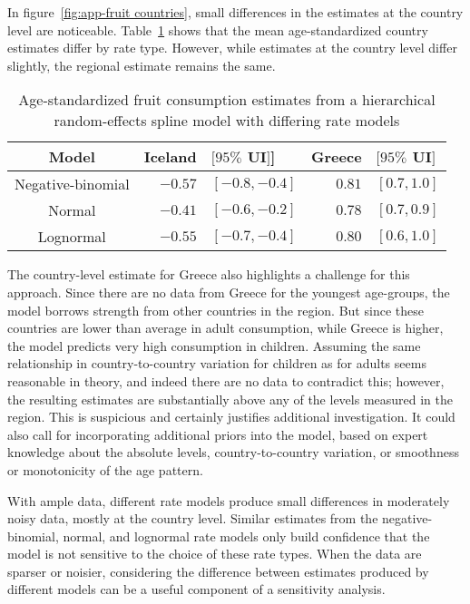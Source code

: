 In figure~\ref{fig:app-fruit countries},
small differences in the estimates at the country level are noticeable.
Table~\ref{tab:app-fruit rfx} shows that the mean age-standardized
country estimates differ by rate type.  However, while estimates at
the country level differ slightly, the regional estimate remains the same.

    \begin{table}[h]
        \begin{center}
        \begin{tabular}{|c|rl|rl|}
            \hline
                Model & Iceland&$[95\%$ UI$]$] & Greece&$[95\%$ UI$]$ \\
            \hline
                Negative-binomial & $-0.57$&$ [-0.8, -0.4]$ & $0.81$&$ [0.7, 1.0]$ \\
                Normal & $-0.41$&$ [-0.6, -0.2]$ & $0.78$&$ [0.7, 0.9]$ \\
                Lognormal & $-0.55$& $[-0.7, -0.4]$ & $0.80$&$ [0.6, 1.0]$ \\
            \hline
        \end{tabular}
        \end{center}
        \caption{ Age-standardized fruit consumption estimates
          from a hierarchical random-effects spline model with differing
          rate models}
        \label{tab:app-fruit rfx}
    \end{table}

The country-level estimate for Greece also highlights a challenge for
this approach.  Since there are no data from Greece for the youngest
age-groups, the model borrows strength from other countries in the
region.  But since these countries are lower than average in adult
consumption, while Greece is higher, the model predicts very high
consumption in children.  Assuming the same relationship in
country-to-country variation for children as for adults seems reasonable
in theory, and indeed there are no data to contradict this; however,
the resulting estimates are substantially above any of the levels
measured in the region.  This is suspicious and certainly justifies
additional investigation.  It could also call for incorporating
additional priors into the model, based on expert knowledge about the
absolute levels, country-to-country variation, or smoothness or
monotonicity of the age pattern.

With ample data, different rate models produce small differences in
moderately noisy data, mostly at the country level.  Similar estimates
from the negative-binomial, normal, and lognormal rate models only
build confidence that the model is not sensitive to the choice of these
rate types.  When the data are sparser or noisier, considering the
difference between estimates produced by different models can be a
useful component of a sensitivity analysis.
